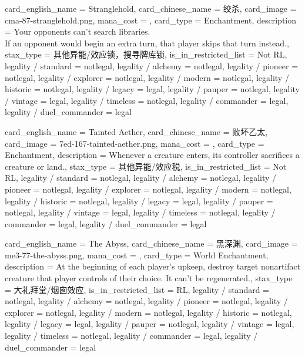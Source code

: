 \documentclass[lang = cn, color = black, 10pt]{AllThatStax}
\begin{document}
\card
{
	card_english_name = {Stranglehold},
	card_chinese_name = {绞杀},
	card_image = cma-87-stranglehold.png,
	mana_cost = ,
	card_type = Enchantment,
	description = {Your opponents can't search libraries.\\
		If an opponent would begin an extra turn, that player skips that turn instead.},
	stax_type = 其他异能/效应锁，搜寻牌库锁,
	is_in_restricted_list = Not RL,
	legality / standard = notlegal,
	legality / alchemy = notlegal,
	legality / pioneer = notlegal,
	legality / explorer = notlegal,
	legality / modern = notlegal,
	legality / historic = notlegal,
	legality / legacy = legal,
	legality / pauper = notlegal,
	legality / vintage = legal,
	legality / timeless = notlegal,
	legality / commander = legal,
	legality / duel_commander = legal
}

\card
{
	card_english_name = {Tainted Aether},
	card_chinese_name = {败坏乙太},
	card_image = 7ed-167-tainted-aether.png,
	mana_cost = ,
	card_type = Enchantment,
	description = {Whenever a creature enters, its controller sacrifices a creature or land.},
	stax_type = 其他异能/效应税,
	is_in_restricted_list = Not RL,
	legality / standard = notlegal,
	legality / alchemy = notlegal,
	legality / pioneer = notlegal,
	legality / explorer = notlegal,
	legality / modern = notlegal,
	legality / historic = notlegal,
	legality / legacy = legal,
	legality / pauper = notlegal,
	legality / vintage = legal,
	legality / timeless = notlegal,
	legality / commander = legal,
	legality / duel_commander = legal
}

\card
{
	card_english_name = {The Abyss},
	card_chinese_name = {黑深渊},
	card_image = me3-77-the-abyss.png,
	mana_cost = ,
	card_type = World Enchantment,
	description = {At the beginning of each player's upkeep, destroy target nonartifact creature that player controls of their choice. It can't be regenerated.},
	stax_type = 大礼拜堂/烟囱效应,
	is_in_restricted_list = RL,
	legality / standard = notlegal,
	legality / alchemy = notlegal,
	legality / pioneer = notlegal,
	legality / explorer = notlegal,
	legality / modern = notlegal,
	legality / historic = notlegal,
	legality / legacy = legal,
	legality / pauper = notlegal,
	legality / vintage = legal,
	legality / timeless = notlegal,
	legality / commander = legal,
	legality / duel_commander = legal
}
\end{document}
